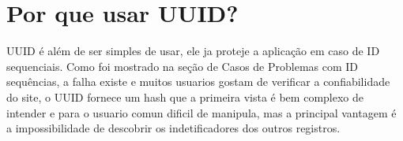 \section{Por que usar UUID?}
UUID é além de ser simples de usar, ele ja proteje a aplicação em caso de ID sequenciais.
Como foi mostrado na seção de Casos de Problemas com ID sequências, a falha existe e muitos usuarios gostam de verificar
a confiabilidade do site, o UUID fornece um hash que a primeira vista é bem complexo de intender e para o usuario comun
dificil de manipula, mas a principal vantagem é a impossibilidade de descobrir os indetificadores dos outros registros.